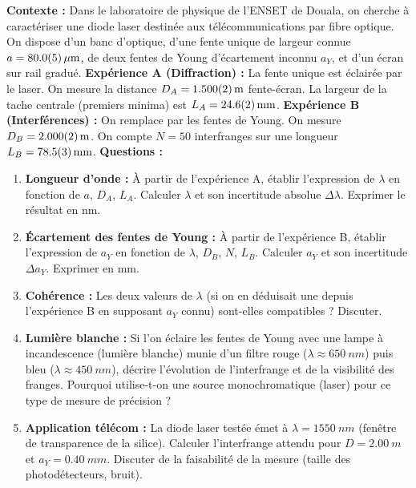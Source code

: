 \documentclass[11pt]{article}
\begin{document}
\begin{exercice}
\textbf{Contexte :} Dans le laboratoire de physique de l'ENSET de Douala, on cherche à caractériser une diode laser destinée aux télécommunications par fibre optique. On dispose d'un banc d'optique, d'une fente unique de largeur connue $a = \SI{80,0 \pm 0,5}{\mu m}$, de deux fentes de Young d'écartement inconnu $a_Y$, et d'un écran sur rail gradué.
\textbf{Expérience A (Diffraction) :} La fente unique est éclairée par le laser. On mesure la distance $D_A = \SI{1,500 \pm 0,002}{m}$ fente-écran. La largeur de la tache centrale (premiers minima) est $L_A = \SI{24,6 \pm 0,2}{mm}$.
\textbf{Expérience B (Interférences) :} On remplace par les fentes de Young. On mesure $D_B = \SI{2,000 \pm 0,002}{m}$. On compte $N = 50$ interfranges sur une longueur $L_B = \SI{78,5 \pm 0,3}{mm}$.
\textbf{Questions :}
\begin{enumerate}
    \item \textbf{Longueur d'onde :} À partir de l'expérience A, établir l'expression de $\lambda$ en fonction de $a$, $D_A$, $L_A$. Calculer $\lambda$ et son incertitude absolue $\Delta \lambda$. Exprimer le résultat en nm.
    \item \textbf{Écartement des fentes de Young :} À partir de l'expérience B, établir l'expression de $a_Y$ en fonction de $\lambda$, $D_B$, $N$, $L_B$. Calculer $a_Y$ et son incertitude $\Delta a_Y$. Exprimer en mm.
    \item \textbf{Cohérence :} Les deux valeurs de $\lambda$ (si on en déduisait une depuis l'expérience B en supposant $a_Y$ connu) sont-elles compatibles ? Discuter.
    \item \textbf{Lumière blanche :} Si l'on éclaire les fentes de Young avec une lampe à incandescence (lumière blanche) munie d'un filtre rouge ($\lambda \approx \SI{650}{nm}$) puis bleu ($\lambda \approx \SI{450}{nm}$), décrire l'évolution de l'interfrange et de la visibilité des franges. Pourquoi utilise-t-on une source monochromatique (laser) pour ce type de mesure de précision ?
    \item \textbf{Application télécom :} La diode laser testée émet à $\lambda = \SI{1550}{nm}$ (fenêtre de transparence de la silice). Calculer l'interfrange attendu pour $D = \SI{2,00}{m}$ et $a_Y = \SI{0,40}{mm}$. Discuter de la faisabilité de la mesure (taille des photodétecteurs, bruit).
\end{enumerate}
\end{exercice}
\end{document}
